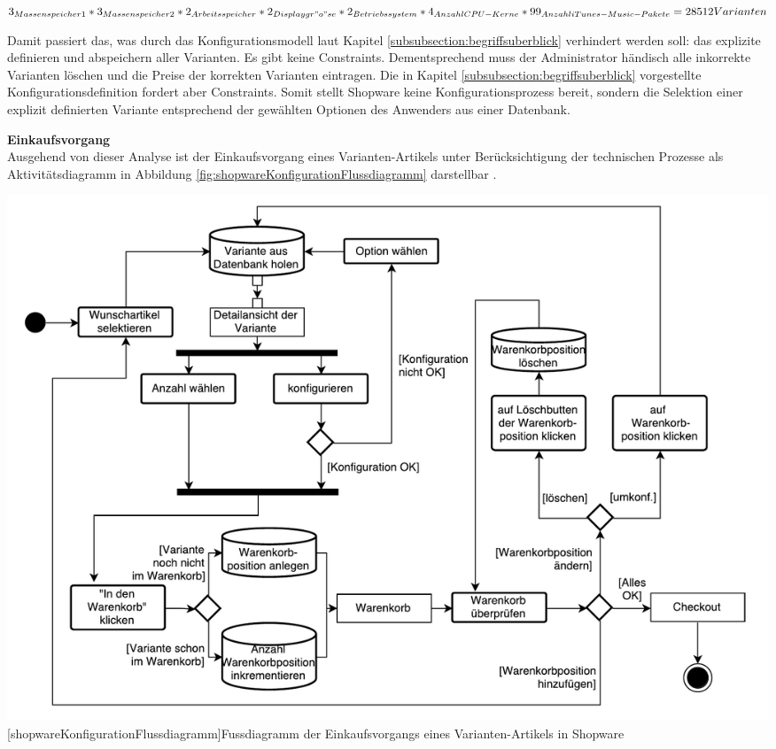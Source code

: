 \documentclass[12pt,a4paper,bibliography=totocnumbered,listof=totoc]{scrartcl}
\begin{document}
$3_{Massenspeicher1}*3_{Massenspeicher2}*2_{Arbeitsspeicher}*2_{Displaygr"o"se}*2_{Betriebssystem}*4_{Anzahl CPU-Kerne}*99_{Anzahl iTunes-Music-Pakete} = 28512  Varianten$

Damit passiert das, was durch das Konfigurationsmodell laut Kapitel \ref{subsubsection:begriffsuberblick} verhindert werden soll: das explizite definieren und abspeichern aller Varianten. Es gibt keine Constraints. Dementsprechend muss der Administrator händisch alle inkorrekte Varianten löschen und die Preise der korrekten Varianten eintragen. Die in Kapitel \ref{subsubsection:begriffsuberblick} vorgestellte Konfigurationsdefinition \citet{sabin98} fordert aber Constraints. Somit stellt Shopware keine Konfigurationsprozess bereit, sondern die Selektion einer explizit definierten Variante entsprechend der gewählten Optionen des Anwenders aus einer Datenbank.

\textbf{Einkaufsvorgang}\\
Ausgehend von dieser Analyse ist der Einkaufsvorgang eines Varianten-Artikels unter Berücksichtigung der technischen Prozesse als Aktivitätsdiagramm in Abbildung \ref{fig:shopwareKonfigurationFlussdiagramm} darstellbar .

\vspace{1em}
\begin{minipage}{\linewidth}
	\centering
	\includegraphics[width=1\linewidth]{Abbildungen/shopwareKonfigurationFlussdiagramm.pdf}
	[shopwareKonfigurationFlussdiagramm]{Fussdiagramm der Einkaufsvorgangs eines Varianten-Artikels in Shopware}
	\label{fig:shopwareKonfigurationFlussdiagramm}
\end{minipage}
\vspace{1em}
\end{document}
